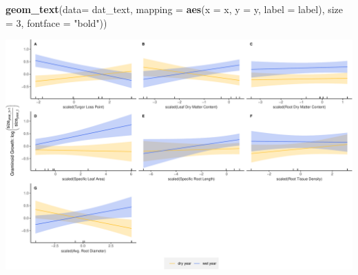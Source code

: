 \documentclass[
]{article}
\newenvironment{Shaded}{\begin{snugshade}}{\end{snugshade}}
\newcommand{\DataTypeTok}[1]{\textcolor[rgb]{0.13,0.29,0.53}{#1}}
\newcommand{\DecValTok}[1]{\textcolor[rgb]{0.00,0.00,0.81}{#1}}
\newcommand{\KeywordTok}[1]{\textcolor[rgb]{0.13,0.29,0.53}{\textbf{#1}}}
\newcommand{\NormalTok}[1]{#1}
\newcommand{\StringTok}[1]{\textcolor[rgb]{0.31,0.60,0.02}{#1}}
\begin{document}
\begin{Shaded}
\begin{Highlighting}[]
\StringTok{  }\KeywordTok{geom\_text}\NormalTok{(}\DataTypeTok{data=}\NormalTok{ dat\_text, }\DataTypeTok{mapping =} \KeywordTok{aes}\NormalTok{(}\DataTypeTok{x =}\NormalTok{ x, }\DataTypeTok{y =}\NormalTok{ y, }\DataTypeTok{label =}\NormalTok{ label), }\DataTypeTok{size =} \DecValTok{3}\NormalTok{, }\DataTypeTok{fontface =} \StringTok{"bold"}\NormalTok{))}
\end{Highlighting}
\end{Shaded}

\includegraphics{figures/supGramGrowthPlots-1.pdf}
\end{document}
